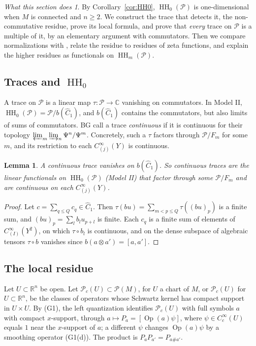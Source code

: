 \documentclass[11pt,oneside,reqno]{article}
\DeclareMathOperator{\HH}{HH}
\DeclareMathOperator{\Op}{Op}
\newcommand{\C}{\mathbb C}
\newcommand{\R}{\mathbb R}
\newcommand{\cP}{\mathcal P}
\newcommand{\CI}{C^\infty}
\newcommand{\Chat}{\widehat C}
\theoremstyle{plain}
\newtheorem{lemma}[theorem]{Lemma}
\theoremstyle{definition}
\theoremstyle{remark}
\newtheorem*{whatdoes}{What this section does}
\begin{document}
\begin{whatdoes}
By Corollary~\ref{cor:HH0}, \(\HH_0(\cP)\) is one-dimensional when \(M\) is connected and
\(n\ge2\). We construct the trace that detects it, the non-commutative residue,
prove its local formula, and prove that \emph{every} trace on \(\cP\) is a multiple of
it, by an elementary argument with commutators. Then we compare normalizations
with \cite{BG}, relate the residue to residues of zeta functions, and explain
the higher residues as functionals on \(\HH_m(\cP)\).
\end{whatdoes}

\subsection{Traces and \texorpdfstring{\(\HH_0\)}{HH0}}\label{subsec:tracesHH0}
A trace on \(\cP\) is a linear map \(\tau:\cP\to\C\) vanishing on commutators. In Model II,
\(\HH_0(\cP)=\cP/b(\Chat_1)\), and \(b(\Chat_1)\) contains the commutators, but also limits of
sums of commutators. BG call a trace \emph{continuous} if it is continuous for their
topology \(\varprojlim_m\varinjlim_n\Psi^n/\Psi^m\). Concretely, such a \(\tau\) factors through
\(\cP/F_m\) for some \(m\), and its restriction to each \(\CI_{(j)}(Y)\) is continuous.

\begin{lemma}\label{lem:conttrace}
A continuous trace vanishes on \(b(\Chat_1)\). So continuous traces are the linear
functionals on \(\HH_0(\cP)\) (Model II) that factor through some \(\cP/F_m\) and are
continuous on each \(\CI_{(j)}(Y)\).
\end{lemma}

\begin{proof}
Let \(c=\sum_{q\le Q}c_q\in\Chat_1\). Then \(\tau(bu)=\sum_{m<p\le Q}\tau((bu)_p)\) is a finite sum,
and \((bu)_p=\sum_lb_lu_{p+l}\) is finite. Each \(c_q\) is a finite sum of elements of
\(\CI_{(I)}(Y^2)\), on which \(\tau\circ b_l\) is continuous, and on the dense subspace of
algebraic tensors \(\tau\circ b\) vanishes since \(b(a\otimes a')=[a,a']\).
\end{proof}

\subsection{The local residue}\label{subsec:localres}
Let \(U\subset\R^n\) be open. Let \(\cP_c(U)\subset\cP(M)\), for \(U\) a chart of \(M\), or
\(\cP_c(U)\) for \(U\subset\R^n\), be the classes of operators whose Schwartz kernel has
compact support in \(U\times U\). By (G1), the left quantization identifies \(\cP_c(U)\)
with full symbols \(a\) with compact \(x\)-support, through \(a\mapsto P_a=[\Op(a)\psi]\),
where \(\psi\in\CI_c(U)\) equals \(1\) near the \(x\)-support of \(a\); a different \(\psi\) changes
\(\Op(a)\psi\) by a smoothing operator (G1(d)). The product is \(P_aP_{a'}=P_{a\#a'}\).
\end{document}
